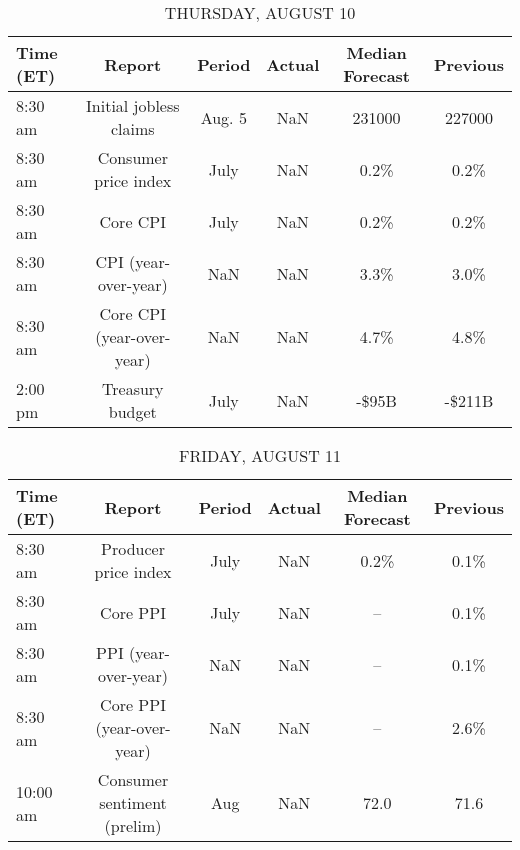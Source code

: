 \documentclass{article}%
\begin{document}
%


\begin{table}[htbp]%
\caption{THURSDAY, AUGUST 10}%
\centering%
\begin{adjustbox}{width=1\textwidth}%
\begin{tabular}{lccccc}
\toprule
Time (ET) &                    Report & Period & Actual & Median Forecast & Previous \\
\midrule
  8:30 am &    Initial jobless claims & Aug. 5 &    NaN &          231000 &   227000 \\
  8:30 am &      Consumer price index &   July &    NaN &            0.2\% &     0.2\% \\
  8:30 am &                  Core CPI &   July &    NaN &            0.2\% &     0.2\% \\
  8:30 am &      CPI (year-over-year) &    NaN &    NaN &            3.3\% &     3.0\% \\
  8:30 am & Core CPI (year-over-year) &    NaN &    NaN &            4.7\% &     4.8\% \\
  2:00 pm &           Treasury budget &   July &    NaN &           -\$95B &   -\$211B \\
\bottomrule
\end{tabular}
%
\end{adjustbox}%
\end{table}

%


\begin{table}[htbp]%
\caption{FRIDAY, AUGUST 11}%
\centering%
\begin{adjustbox}{width=1\textwidth}%
\begin{tabular}{lccccc}
\toprule
Time (ET) &                      Report & Period & Actual & Median Forecast & Previous \\
\midrule
  8:30 am &        Producer price index &   July &    NaN &            0.2\% &     0.1\% \\
  8:30 am &                    Core PPI &   July &    NaN &              -- &     0.1\% \\
  8:30 am &        PPI (year-over-year) &    NaN &    NaN &              -- &     0.1\% \\
  8:30 am &   Core PPI (year-over-year) &    NaN &    NaN &              -- &     2.6\% \\
 10:00 am & Consumer sentiment (prelim) &    Aug &    NaN &            72.0 &     71.6 \\
\bottomrule
\end{tabular}
%
\end{adjustbox}%
\end{table}
\end{document}
